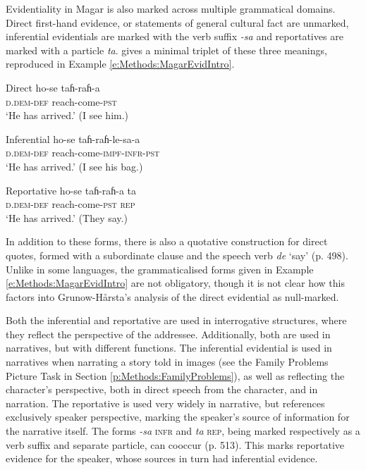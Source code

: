 Evidentiality in Magar is also marked across multiple grammatical domains. Direct first-hand evidence, or statements of general cultural fact are unmarked, inferential evidentials are marked with the verb suffix \textit{-sa} and reportatives are marked with a particle \textit{ta}.  gives a minimal triplet of these three meanings, reproduced in Example \ref{e:Methods:MagarEvidIntro}.

\begin{exe}
  \ex \label{e:Methods:MagarEvidIntro}
  \begin{xlist}
    \ex Direct
    \gll ho-se taɦ-raɦ-a \\
    \textsc{d.dem-def} reach-come-\textsc{pst} \\
    \glt `He has arrived.' (I see him.)

    \ex Inferential
    \gll ho-se taɦ-raɦ-le-sa-a \\
    \textsc{d.dem-def} reach-come-\textsc{impf-infr-pst} \\
    \glt `He has arrived.' (I see his bag.)

    \ex Reportative
    \gll ho-se taɦ-raɦ-a ta \\
    \textsc{d.dem-def} reach-come-\textsc{pst} \textsc{rep} \\
    \glt `He has arrived.' (They say.)
  \end{xlist}
  \cite[Magar,][497]{GrunowHarsta2008}
\end{exe}

In addition to these forms, there is also a quotative construction for direct quotes, formed with a subordinate clause and the speech verb \textit{de} `say' (p. 498). Unlike in some languages, the grammaticalised forms given in Example \ref{e:Methods:MagarEvidIntro} are not obligatory, though it is not clear how this factors into Grunow-Hårsta's analysis of the direct evidential as null-marked.

Both the inferential and reportative are used in interrogative structures, where they reflect the perspective of the addressee. Additionally, both are used in narratives, but with different functions. The inferential evidential is used in narratives when narrating a story told in images (see the Family Problems Picture Task in Section \ref{p:Methods:FamilyProblems}), as well as reflecting the character's perspective, both in direct speech from the character, and in narration. The reportative is used very widely in narrative, but references exclusively speaker perspective, marking the speaker's source of information for the narrative itself. The forms \textit{-sa} \textsc{infr} and \textit{ta} \textsc{rep}, being marked respectively as a verb suffix and separate particle, can cooccur (p. 513). This marks reportative evidence for the speaker, whose sources in turn had inferential evidence.

